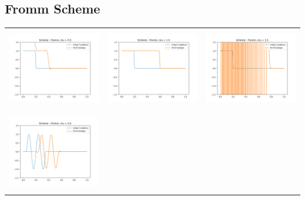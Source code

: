 \documentclass[a4paper,twoside,11pt]{article}
\begin{document}
      \subsection*{Fromm Scheme}
      \begin{table}[!h]
          \centering
          \begin{tabular}{ | c | m{5cm} | m{5cm} | }
            \hline
            \begin{minipage}{.3\textwidth}
              \includegraphics[width=\linewidth, height=3.5cm]{../plots/scheme6-IC1-mu0_5.png}
            \end{minipage}
            &
            \begin{minipage}{.3\textwidth}
              \includegraphics[width=\linewidth, height=3.5cm]{../plots/scheme6-IC1-mu1_0.png}
            \end{minipage}
            &
            \begin{minipage}{.3\textwidth}
              \includegraphics[width=\linewidth, height=3.5cm]{../plots/scheme6-IC1-mu1_5.png}
            \end{minipage} \\
            \begin{minipage}{.3\textwidth}
              \includegraphics[width=\linewidth, height=3.5cm]{../plots/scheme6-IC2-mu0_5.png}

\end{minipage}
\end{tabular}
\end{table}
\end{document}
